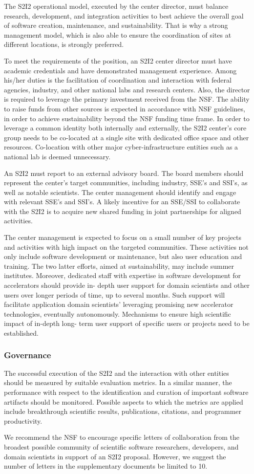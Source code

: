 The S2I2 operational model, executed by the center director, must balance research, development, and integration activities to best achieve the overall goal of software creation, maintenance, and sustainability. That is why a strong management model, which is also able to ensure the coordination of sites at different locations, is strongly preferred.

To meet the requirements of the position, an S2I2 center director must have academic credentials and have demonstrated management experience. Among his/her duties is the facilitation of coordination and interaction with federal agencies, industry, and other national labs and research centers. Also, the director is required to leverage the primary investment received from the NSF. The ability to raise funds from other sources is expected in accordance with NSF guidelines, in order to achieve sustainability beyond the NSF funding time frame.
In order to leverage a common identity both internally and externally, the S2I2 center's core group needs to be co-located at a single site with dedicated office space and other resources. Co-location with other major cyber-infrastructure entities such as a national lab is deemed unnecessary.

An S2I2 must report to an external advisory board. The board members should represent the center's target communities, including industry, SSE's and SSI's, as well as notable scientists.
The center management should identify and engage with relevant SSE’s and SSI’s. A likely incentive for an SSE/SSI to collaborate with the S2I2 is to acquire new shared funding in joint partnerships for aligned activities.

The center management is expected to focus on a small number of key projects and activities with high impact on the targeted communities. These activities not only include software development or maintenance, but also user education and training. The two latter efforts, aimed at sustainability, may include summer institutes. Moreover, dedicated staff with expertise in software development for accelerators should provide in- depth user support for domain scientists and other users over longer periods of time, up to several months. Such support will facilitate application domain scientists' leveraging promising new accelerator technologies, eventually autonomously. Mechanisms to ensure high scientific impact of in-depth long- term user support of specific users or projects need to be established.

\subsubsection{Governance}
The successful execution of the S2I2 and the interaction with other entities should be measured by suitable evaluation metrics. In a similar manner, the performance with respect to the identification and curation of important software artifacts should be monitored. Possible aspects to which the metrics are applied include breakthrough scientific results, publications, citations, and programmer productivity.

We recommend the NSF to encourage specific letters of collaboration from the broadest possible community of scientific software researchers, developers, and domain scientists in support of an S2I2 proposal. However, we suggest the number of letters in the supplementary documents be limited to 10.
